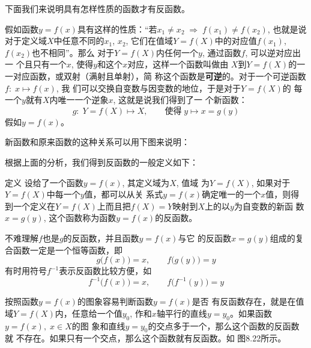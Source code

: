 \begin{figure}[htp]
    \centering

    \caption{}
\end{figure}


下面我们来说明具有怎样性质的函数才有反函数。

假如函数$y=f(x)$具有这样的性质：“若$x_1\ne x_2\; \Rightarrow\; f(x_1)\ne f(x_2)$, 也就是说对于定义域$X$中任意不同的$x_1$, $x_2$, 它们在值域$Y=f(X)$中的对应值$f(x_1)$, $f(x_2)$也不相同”。那么
对于$Y=f(X)$内任何一个$y$, 通过函数$f$, 可以逆对应出一
个且只有一个$x$, 使得$y$和这个$x$对应，这样一个函数叫做由
$X$到$Y=f(X)$的一一对应函数，或双射（满射且单射），简
称这个函数是\textbf{可逆}的。对于一个可逆函数$f:\; x\mapsto f(x)$, 我
们可以交换自变数与因变数的地位，于是对于$Y=f(X)$的
每一个$y$就有$X$内唯一一个逆象$x$, 这就是说我们得到了一
个新函数：
\[ g:\; Y=f(X)\mapsto X,\qquad \text{使得}\; y\mapsto x=g(y)\]
假如$y=f(x)$。

新函数和原来函数的这种关系可以用下图来说明：

根据上面的分析，我们得到反函数的一般定义如下：
 
\begin{blk}{定义}
    设给了一个函数$y=f(x)$, 其定义域为$X$, 值域
为$Y=f(X)$, 如果对于$Y=f(X)$中每一个$y$值，都可以从关
系式$y=f(x)$确定唯一的一个$x$值，则得到一个定义在$Y=
f(X)$上而且把$f(X)=Y$映射到$X$上的以$y$为自变数的新函
数$x=g(y)$, 这个函数称为函数$y=f(x)$的反函数。
\end{blk}

不难理解$f$也是$g$的反函数，并且函数$y=f(x)$与它
的反函数$x=g(y)$组成的复合函数一定是一个恒等函数，即
\[ g\big(f(x)\big)=x,\qquad f\big(g(y)\big)= y\]
有时用符号$f^{-1}$表示反函数比较方便，如
\[f^{-1}\big(f(x)\big)=x,\qquad f\big(f^{-1}(y)\big)=y\]

按照函数$y=f(x)$的图象容易判断函数$y=f(x)$是否
有反函数存在，就是在值域$Y=f(X)$内，任意给一个值$y_0$,
作和$x$轴平行的直线$y=y_0$。如果函数$y=f(x),\; x\in X$的图
象和直线$y=y_0$的交点多于一个，那么这个函数的反函数就
不存在。如果只有一个交点，那么这个函数就有反函数。如
图8.22所示。

